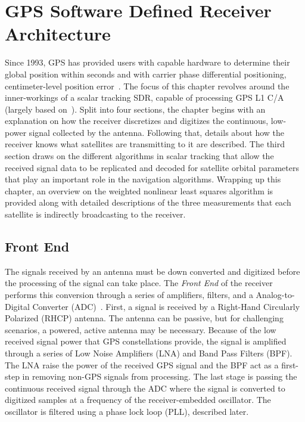 \chapter{\textbf{GPS Software Defined Receiver Architecture}}\label{chpater:scalartracking}
Since 1993, GPS has provided users with capable hardware to determine their global position within seconds and with carrier phase differential positioning, centimeter-level position error~\cite{humphreysLowcostPreciseVehicular2018}. The focus of this chapter revolves around the inner-workings of a scalar tracking SDR, capable of processing GPS L1 C/A (largely based on~\cite{millerSNAPXonaSpace2023}). Split into four sections, the chapter begins with an explanation on how the receiver discretizes and digitizes the continuous, low-power signal collected by the antenna. Following that, details about how the receiver knows what satellites are transmitting to it are described. The third section draws on the different algorithms in scalar tracking that allow the received signal data to be replicated and decoded for satellite orbital parameters that play an important role in the navigation algorithms. Wrapping up this chapter, an overview on the weighted nonlinear least squares algorithm is provided along with detailed descriptions of the three measurements that each satellite is indirectly broadcasting to the receiver.

\section{\textbf{Front End}}
The signals received by an antenna must be down converted and digitized before the processing of the signal can take place. The \textit{Front End} of the receiver performs this conversion through a series of amplifiers, filters, and a Analog-to-Digital Converter (ADC)~\cite{kaplanUnderstandingGPSPrinciples2006}. First, a signal is received by a Right-Hand Circularly Polarized (RHCP) antenna. The antenna can be passive, but for challenging scenarios, a powered, active antenna may be necessary. Because of the low received signal power that GPS constellations provide, the signal is amplified through a series of Low Noise Amplifiers (LNA) and Band Pass Filters (BPF). The LNA raise the power of the received GPS signal and the BPF act as a first-step in removing non-GPS signals from processing. The last stage is passing the continuous received signal through the ADC where the signal is converted to digitized samples at a frequency of the receiver-embedded oscillator. The oscillator is filtered using a phase lock loop (PLL), described later.

